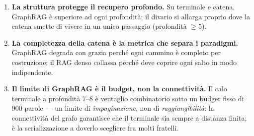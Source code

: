 \documentclass[11pt,a4paper]{report}
\newcommand{\gr}{GraphRAG}
\begin{document}
\begin{enumerate}
  \item \textbf{La struttura protegge il recupero profondo.} Su terminale e catena, \gr{} è
        superiore ad ogni profondità; il divario si allarga proprio dove la catena smette di
        vivere in un unico passaggio (profondità $\geq 5$).
  \item \textbf{La completezza della catena è la metrica che separa i paradigmi.} \gr{}
        degrada con grazia perché ogni cammino è completo per costruzione; il RAG denso
        collassa perché deve coprire ogni salto in modo indipendente.
  \item \textbf{Il limite di \gr{} è il budget, non la connettività.} Il calo terminale a
        profondità 7--8 è ventaglio combinatorio sotto un budget fisso di \num{900} parole
        --- un limite di \emph{impaginazione}, non di \emph{raggiungibilità}: la connettività
        del grafo garantisce che il terminale sia sempre a distanza finita; è la
        serializzazione a doverlo scegliere fra molti fratelli.
\end{enumerate}
\end{document}
